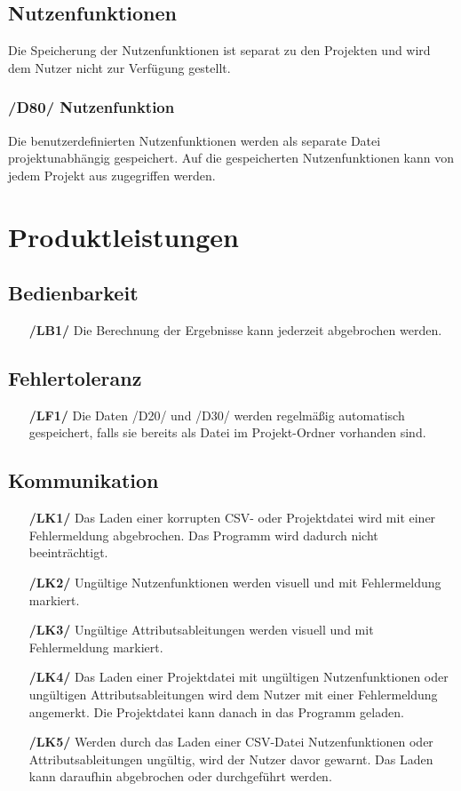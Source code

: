 \documentclass{article}
\begin{document}
\subsection{Nutzenfunktionen}
Die Speicherung der Nutzenfunktionen ist separat zu den Projekten und wird dem Nutzer nicht zur Verfügung gestellt.
\subsubsection*{/D80/ Nutzenfunktion}
Die benutzerdefinierten Nutzenfunktionen werden als separate Datei projektunabhängig gespeichert. Auf die gespeicherten Nutzenfunktionen kann von jedem Projekt aus zugegriffen werden.


\clearpage
\section{Produktleistungen}
\subsection{Bedienbarkeit}
\begin{itemize}
    \item[\textbf{/LB1/}] Die Berechnung der Ergebnisse kann jederzeit abgebrochen werden.
\end{itemize}
\subsection{Fehlertoleranz}
\begin{itemize}
    \item[\textbf{/LF1/}] Die Daten /D20/ und /D30/ werden regelmäßig automatisch gespeichert, falls sie bereits als Datei im Projekt-Ordner vorhanden sind.
\end{itemize}
\subsection{Kommunikation}
\begin{itemize}
    \item[\textbf{/LK1/}] Das Laden einer korrupten CSV- oder Projektdatei wird mit einer Fehlermeldung abgebrochen. Das Programm wird dadurch nicht beeinträchtigt.
    \item[\textbf{/LK2/}] Ungültige Nutzenfunktionen werden visuell und mit Fehlermeldung markiert.
    \item[\textbf{/LK3/}] Ungültige Attributsableitungen werden visuell und mit Fehlermeldung markiert.
    \item[\textbf{/LK4/}] Das Laden einer Projektdatei mit ungültigen Nutzenfunktionen oder ungültigen Attributsableitungen wird dem Nutzer mit einer Fehlermeldung angemerkt. Die Projektdatei kann danach in das Programm geladen.
    \item[\textbf{/LK5/}] Werden durch das Laden einer CSV-Datei Nutzenfunktionen oder Attributsableitungen ungültig, wird der Nutzer davor gewarnt. Das Laden kann daraufhin abgebrochen oder durchgeführt werden.
\end{itemize}
\end{document}

